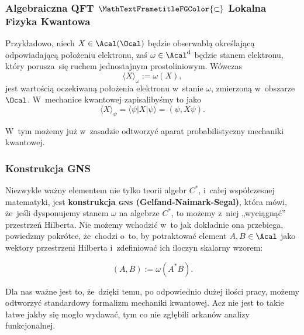 \documentclass[10pt,t]{beamer}
\begin{document}
\begin{frame}
  \frametitle{Algebraiczna QFT $\MathTextFrametitleFGColor{\subset}$
    Lokalna Fizyka Kwantowa}


  Przykładowo, niech $X \in \Acal( \Ocal )$ będzie obserwablą określającą
  odpowiadającą położeniu elektronu, zaś $\omega \in \Acal^{ \text{d} }$
  będzie stanem elektronu, który porusza~się ruchem jednostajnym
  prostoliniowym. Wówczas
  \begin{equation}
    \label{eq:Niespodziewane-teoretyczne-01}
    \langle X \rangle_{ \omega } := \omega( X ),
  \end{equation}
  jest wartością oczekiwaną położenia elektronu w~stanie $\omega$, zmierzoną
  w~obszarze $\Ocal$. W~mechanice kwantowej zapisalibyśmy to jako
  \begin{equation}
    \label{eq:Niespodziewane-teoretyczne-01}
    \langle X \rangle_{ \psi } = \langle \psi | X | \psi \rangle = ( \psi, X \psi ).
  \end{equation}

  \vspace{-2em}



  W~tym możemy już w~zasadzie odtworzyć aparat probabilistyczny mechaniki
  kwantowej.

\end{frame}





\begin{frame}
  \frametitle{Konstrukcja GNS}


  Niezwykle ważny elementem nie tylko teorii algebr $C^{ * }$, i~całej
  współczesnej matematyki, jest \textbf{konstrukcja \textsc{gns}
    (Gelfand-Naimark-Segal)}, która mówi,
  że~jeśli dysponujemy stanem $\omega$ na algebrze $C^{ * }$, to możemy
  z~niej „wyciągnąć” przestrzeń Hilberta. Nie możemy
  wchodzić w~to jak dokładnie ona przebiega, powiedzmy pokrótce, że~chodzi
  o~to, by potraktować element $A, B \in \Acal$ jako wektory przestrzeni
  Hilberta i~zdefiniować ich iloczyn skalarny wzorem:

  \vspace{-1.5em}



  \begin{equation}
    \label{eq:Niespodziewane-teoretyczne-01}
    ( A, B ) := \omega( A^{ * } B ).
  \end{equation}

  \vspace{-1.5em}



  Dla nas ważne jest to, że~dzięki temu, po odpowiednio dużej ilości
  pracy, możemy odtworzyć standardowy formalizm mechaniki kwantowej.
  Acz nie jest to takie łatwe jakby się mogło wydawać, tym co nie zgłębili
  arkanów analizy funkcjonalnej.

\end{frame}
\end{document}
